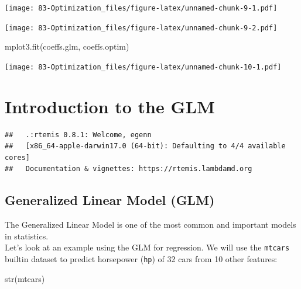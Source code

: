 \documentclass[
]{book}
\newenvironment{Shaded}{\begin{snugshade}}{\end{snugshade}}
\newcommand{\DecValTok}[1]{\textcolor[rgb]{0.00,0.00,0.81}{#1}}
\newcommand{\FunctionTok}[1]{\textcolor[rgb]{0.00,0.00,0.00}{#1}}
\newcommand{\NormalTok}[1]{#1}
\newcommand{\OtherTok}[1]{\textcolor[rgb]{0.56,0.35,0.01}{#1}}
\newcommand{\SpecialCharTok}[1]{\textcolor[rgb]{0.00,0.00,0.00}{#1}}
\begin{document}
\texttt{[image: 83-Optimization\_files/figure-latex/unnamed-chunk-9-1.pdf]}

\begin{Shaded}
\end{Shaded}

\texttt{[image: 83-Optimization\_files/figure-latex/unnamed-chunk-9-2.pdf]}

\begin{Shaded}
\begin{Highlighting}[]
\FunctionTok{mplot3.fit}\NormalTok{(coeffs.glm, coeffs.optim)}
\end{Highlighting}
\end{Shaded}

\texttt{[image: 83-Optimization\_files/figure-latex/unnamed-chunk-10-1.pdf]}

\hypertarget{glm}{%
\chapter{Introduction to the GLM}\label{glm}}

\begin{verbatim}
##   .:rtemis 0.8.1: Welcome, egenn
##   [x86_64-apple-darwin17.0 (64-bit): Defaulting to 4/4 available cores]
##   Documentation & vignettes: https://rtemis.lambdamd.org
\end{verbatim}

\hypertarget{generalized-linear-model-glm}{%
\section{Generalized Linear Model (GLM)}\label{generalized-linear-model-glm}}

The Generalized Linear Model is one of the most common and important models in statistics.\\
Let's look at an example using the GLM for regression. We will use the \texttt{mtcars} builtin dataset to predict horsepower (\texttt{hp}) of 32 cars from 10 other features:

\begin{Shaded}
\begin{Highlighting}[]
\FunctionTok{str}\NormalTok{(mtcars)}
\end{Highlighting}
\end{Shaded}
\end{document}
